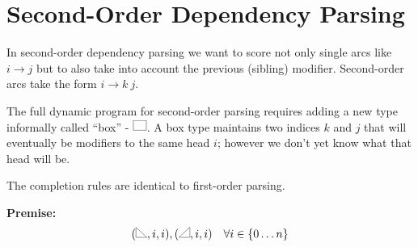 \documentclass{article}
\begin{document}


\pagebreak

\section{Second-Order Dependency Parsing}

In second-order dependency parsing we want to score not only single arcs like $i \rightarrow j$ but to also take into account the previous (sibling) modifier. Second-order arcs take the form $i \rightarrow k\ j$.

The full dynamic program for second-order parsing requires adding a new type informally called ``box'' - $\abox$.  A box type maintains two indices $k$ and $j$ that will eventually be modifiers to the same head $i$; however we don't yet know what that head will be.

The completion rules are identical to first-order parsing.


\noindent \textbf{Premise:}
\[(\rtri, i,i), (\ltri, i,i)\ \ \  \forall i \in \{0 \ldots n\}\]
\end{document}
